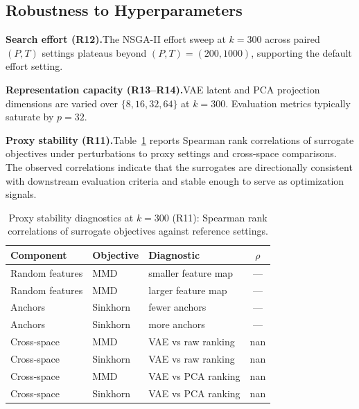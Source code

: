 \documentclass[10pt,journal]{IEEEtran}
\newcommand{\1}{\mathbf{1}}
\theoremstyle{ieeethm}
\begin{document}
\subsection{Robustness to Hyperparameters}
\label{subsec:q_robustness}

\textbf{Search effort (R12).}\enspace The NSGA-II effort sweep at $k=300$ across paired $(P,T)$
settings plateaus beyond $(P,T)=(200,1000)$, supporting the default effort setting.

\textbf{Representation capacity (R13--R14).}\enspace VAE latent and PCA projection dimensions
are varied over $\{8,16,32,64\}$ at $k=300$. Evaluation metrics typically saturate by $p=32$.

\textbf{Proxy stability (R11).}\enspace Table~\ref{tab:proxy-stability} reports Spearman rank
correlations of surrogate objectives under perturbations to proxy settings and cross-space
comparisons. The observed correlations indicate that the surrogates are directionally consistent
with downstream evaluation criteria and stable enough to serve as optimization signals.

\begin{table}[t]
\centering
\caption{Proxy stability diagnostics at $k=300$ (R11): Spearman rank correlations of surrogate objectives against
reference settings.}
\label{tab:proxy-stability}
\small
\begin{tabular}{l l l c}
\toprule
Component & Objective & Diagnostic & $\rho$ \\
\midrule
Random features & MMD & smaller feature map & --- \\
Random features & MMD & larger feature map & --- \\
Anchors & Sinkhorn & fewer anchors & --- \\
Anchors & Sinkhorn & more anchors & --- \\
Cross-space & MMD & VAE vs raw ranking & nan \\
Cross-space & Sinkhorn & VAE vs raw ranking & nan \\
Cross-space & MMD & VAE vs PCA ranking & nan \\
Cross-space & Sinkhorn & VAE vs PCA ranking & nan \\
\bottomrule
\end{tabular}
\end{table}







\end{document}
